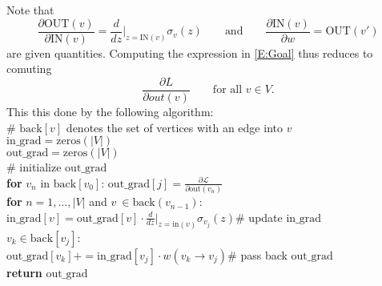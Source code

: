 \documentclass[12pt,reqno]{amsart}
\newcommand{\gives}{\ensuremath{\rightarrow}}
\newcommand{\abs}[1]{\left\lvert #1 \right\rvert}
\begin{document}
Note that 
\begin{equation}
\frac{\partial \text{OUT}(v)}{\partial \text{IN}(v)}=\frac{d}{dz}\big|_{z=\text{IN}(v)} \sigma_v(z)\qquad \text{and}\qquad  \frac{\partial \text{IN}(v)}{\partial w}= \text{OUT}(v')
\end{equation}
are given quantities. Computing the expression in \eqref{E:Goal} thus reduces to comuting 
\[\frac{\partial L}{\partial out(v)}\qquad \text{for all }v\in V.\]
This this done by the following algorithm:\\
\linebreak
\# $\text{back}[v]$ denotes the set of vertices with an edge into $v$\\
\linebreak
$\text{in\_grad}=\text{zeros}(\abs{V})$\\
$\text{out\_grad}=\text{zeros}(\abs{V})$\\  
\linebreak
\# initialize $\text{out\_grad}$\\
\linebreak
{\bf for} $v_n$ in $\text{back}[v_0]$: \quad $\text{out\_grad}[j]=\frac{\partial \mathcal L}{\partial \text{out}(v_n)}$\\
\linebreak
{\bf for} $n=1,\ldots, \abs{V}$ and $v\ \in \text{back}(v_{n-1})$:\\
\linebreak
\indent $\text{in\_grad}[v]=\text{out\_grad}[v]\cdot \frac{d}{dz}\big|_{z=\text{in}(v)}\sigma_{v_j}(z)$\qquad \# update $\text{in\_grad}$ \\
\linebreak
{} $v_k\in \text{back}[v_j]$:\\
\linebreak
 \indent \indent $\text{out\_grad}[v_k]+= \text{in\_grad}[v_j]\cdot w(v_k\gives v_j)$\qquad \# pass back $\text{out\_grad}$\\
\linebreak
{\bf return} $\text{out\_grad}$\\
\end{document}
